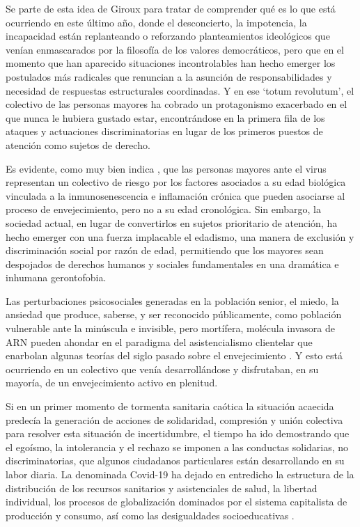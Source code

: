 \documentclass{textolivre}
\begin{document}
Se parte de esta idea de Giroux para tratar de comprender qué es lo que está ocurriendo en este último año, donde el desconcierto, la impotencia, la incapacidad están replanteando o reforzando planteamientos ideológicos que venían enmascarados por la filosofía de los valores democráticos, pero que en el momento que han aparecido situaciones incontrolables han hecho emerger los postulados más radicales que renuncian a la asunción de responsabilidades y necesidad de respuestas estructurales coordinadas. Y en ese ‘totum revolutum’, el colectivo de las personas mayores ha cobrado un protagonismo exacerbado en el que nunca le hubiera gustado estar, encontrándose en la primera fila de los ataques y actuaciones discriminatorias en lugar de los primeros puestos de atención como sujetos de derecho.

Es evidente, como muy bien indica \textcite{pinazo2020}, %
que las personas mayores ante el virus representan un colectivo de riesgo por los factores asociados a su edad biológica vinculada a la inmunosenescencia e inflamación crónica que pueden asociarse al proceso de envejecimiento, pero no a su edad cronológica. Sin embargo, la sociedad actual, en lugar de convertirlos en sujetos prioritario de atención, ha hecho emerger con una fuerza implacable el edadismo, una manera de exclusión y discriminación social por razón de edad, permitiendo que los mayores sean despojados de derechos humanos y sociales fundamentales en una dramática e inhumana gerontofobia.

Las perturbaciones psicosociales generadas en la población senior, el miedo, la ansiedad que produce, saberse, y ser reconocido públicamente, como población vulnerable ante la minúscula e invisible, pero mortífera, molécula invasora de ARN \cite{remuzzi2020} %
pueden ahondar en el paradigma del asistencialismo clientelar que enarbolan algunas teorías del siglo pasado sobre el envejecimiento \cite{fernandezballasteros2000}. %
Y esto está ocurriendo en un colectivo que venía desarrollándose y disfrutaban, en su mayoría, de un envejecimiento activo en plenitud.

Si en un primer momento de tormenta sanitaria caótica la situación acaecida predecía la generación de acciones de solidaridad, compresión y unión colectiva para resolver esta situación de incertidumbre, el tiempo ha ido demostrando que el egoísmo, la intolerancia y el rechazo se imponen a las conductas solidarias, no discriminatorias, que algunos ciudadanos particulares están desarrollando en su labor diaria. La denominada Covid-19 ha dejado en entredicho la estructura de la distribución de los recursos sanitarios y asistenciales de salud, la libertad individual, los procesos de globalización dominados por el sistema capitalista de producción y consumo, así como las desigualdades socioeducativas \cite{caceres-munoz2020}. %
\end{document}
